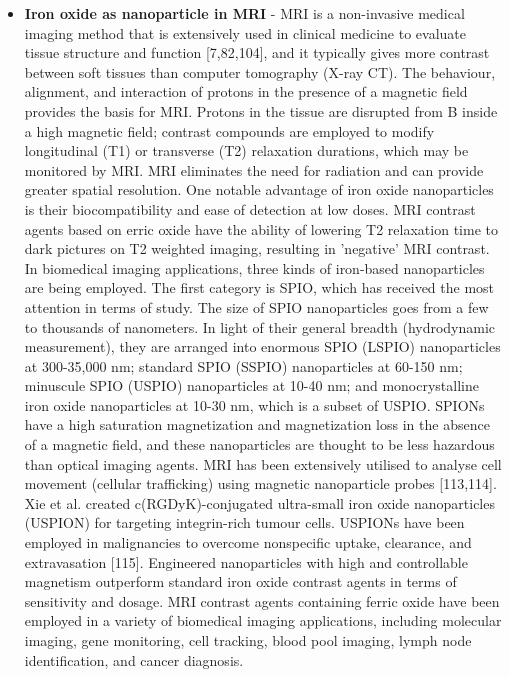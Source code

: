 \documentclass[12pt]{article}
\begin{document}
\begin{itemize}
    \item \textbf{Iron oxide as nanoparticle in MRI } - MRI is a non-invasive medical
    imaging method that is extensively used in clinical medicine to evaluate tissue structure and function [7,82,104], and it typically gives more contrast between soft tissues than computer tomography (X-ray CT). The behaviour, alignment, and interaction of protons in the presence of a magnetic field provides the basis for MRI. Protons in the tissue are disrupted from B inside a high magnetic field; contrast compounds are employed to modify longitudinal (T1) or transverse (T2) relaxation durations, which may be monitored by MRI. MRI eliminates the need for radiation and can provide greater spatial resolution. One notable advantage of iron oxide nanoparticles is their biocompatibility and ease of detection at low doses. MRI contrast agents based on erric oxide have the ability of lowering T2 relaxation time to dark pictures on T2 weighted imaging, resulting in 'negative' MRI contrast. In biomedical imaging applications, three kinds of iron-based nanoparticles are being employed. The first category is SPIO, which has received the most attention in terms of study. The size of SPIO nanoparticles goes from a few to thousands of nanometers. In light of their general breadth (hydrodynamic measurement), they are arranged into enormous SPIO (LSPIO) nanoparticles at 300-35,000 nm; standard SPIO (SSPIO) nanoparticles at 60-150 nm; minuscule SPIO (USPIO) nanoparticles at 10-40 nm; and monocrystalline iron oxide nanoparticles at 10-30 nm, which is a subset of USPIO. SPIONs have a high saturation magnetization and magnetization loss in the absence of a magnetic field, and these nanoparticles are thought to be less hazardous than optical imaging agents. MRI has been extensively utilised to analyse cell movement (cellular trafficking) using magnetic nanoparticle probes [113,114]. Xie et al. created c(RGDyK)-conjugated ultra-small iron oxide nanoparticles (USPION) for targeting integrin-rich tumour cells. USPIONs have been employed in malignancies to overcome nonspecific uptake, clearance, and extravasation [115]. Engineered nanoparticles with high and controllable magnetism outperform standard iron oxide contrast agents in terms of sensitivity and dosage. MRI contrast agents containing ferric oxide have been employed in a variety of biomedical imaging applications, including molecular imaging, gene monitoring, cell tracking, blood pool imaging, lymph node identification, and cancer diagnosis.

\end{itemize}
\end{document}
